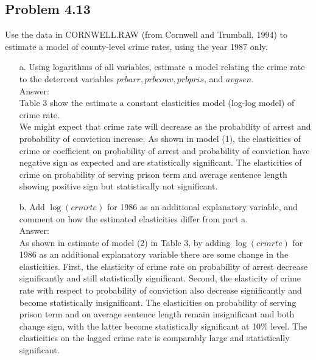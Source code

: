 \documentclass[10pt]{article}
\begin{document}
\subsection*{Problem 4.13}
Use the data in CORNWELL.RAW (from Cornwell and Trumball, 1994) to estimate a model of county-level crime rates, using the year 1987 only.
\begin{enumerate}
\item[a.] Using logarithms of all variables, estimate a model relating the crime rate to the deterrent variables $prbarr, prbconv, prbpris$, and $avgsen.$
\\ Answer:\\
Table 3 show the estimate a constant elasticities model (log-log model) of crime rate. 
\\
We might expect that crime rate will decrease as the probability of arrest and probability of conviction increase. As shown in model (1), the elasticities of crime or coefficient on probability of arrest and probability of conviction have negative sign as expected and are statistically significant. The elasticities of crime on probability of serving prison term and average sentence length showing positive sign but statistically not significant.

\item[b.] Add $\log(crmrte)$ for 1986 as an additional explanatory variable, and comment on how the estimated elasticities differ from part a.
\\ Answer:\\
As shown in estimate of model (2) in Table 3, by adding $\log(crmrte)$ for 1986 as an additional explanatory variable there are some change in the elasticities. First, the elasticity of crime rate on probability of arrest decrease significantly and still statistically significant. Second, the elasticity of crime rate with respect to probability of conviction also decrease significantly and become statistically insignificant. The elasticities on probability of serving prison term and on average sentence length remain insignificant and both change sign, with the latter become statistically significant at 10\% level. The elasticities on the lagged crime rate is comparably large and statistically significant.


\end{enumerate}
\end{document}
